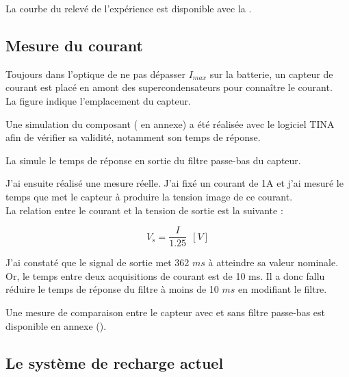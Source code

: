 La courbe du relevé de l'expérience est disponible avec la .

\subsection{Mesure du courant}

Toujours dans l'optique de ne pas dépasser $I_{max}$ sur la batterie, un capteur de courant est placé en amont des supercondensateurs pour connaître le courant.\\

La figure  indique l'emplacement du capteur.


Une simulation du composant ( en annexe) a été réalisée avec le logiciel TINA afin de vérifier sa validité, notamment son temps de réponse.

La  simule le temps de réponse en sortie du filtre passe-bas du capteur.\\



J'ai ensuite réalisé une mesure réelle. J'ai fixé un courant de 1A et j'ai mesuré le temps que met le capteur à produire la tension image de ce courant.\\
La relation entre le courant et la tension de sortie est la suivante : 

$$ V_{s} = \frac{I}{1.25}~~ [V]$$



J'ai constaté que le signal de sortie met 362 $ms$ à atteindre sa valeur nominale. Or, le temps entre deux acquisitions de courant est de 10 ms. Il a donc fallu réduire le temps de réponse du filtre à moins de 10 $ms$ en modifiant le filtre.

Une mesure de comparaison entre le capteur avec et sans filtre passe-bas est disponible en annexe ().


\subsection{Le système de recharge actuel}


